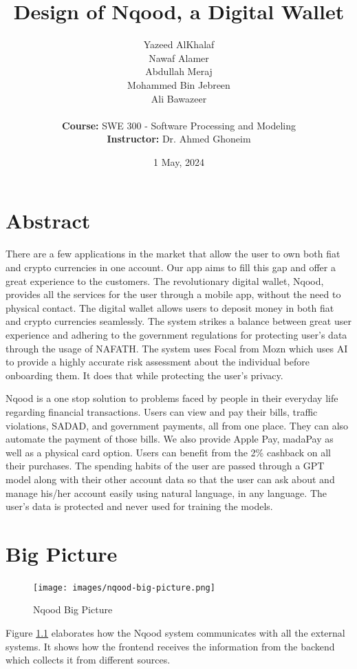 \documentclass[a4paper]{report}
\title{Design of Nqood, a Digital Wallet}
\author{
    Yazeed AlKhalaf \\
    Nawaf Alamer  \\
    Abdullah Meraj \\
    Mohammed Bin Jebreen \\
    Ali Bawazeer \\
    \\
    \textbf{Course:} SWE 300 - Software Processing and Modeling \\
    \textbf{Instructor:} Dr. Ahmed Ghoneim
}
\date{1 May, 2024}
\begin{document}
\maketitle

\newpage

\tableofcontents

\chapter*{Abstract}

There are a few applications in the market that allow the user to own both fiat and crypto currencies in one account. Our app aims to fill this gap and offer a great experience to the customers. The revolutionary digital wallet, Nqood, provides all the services for the user through a mobile app, without the need to physical contact. The digital wallet allows users to deposit money in both fiat and crypto currencies seamlessly. The system strikes a balance between great user experience and adhering to the government regulations for protecting user’s data through the usage of NAFATH. The system uses Focal from Mozn which uses AI to provide a highly accurate risk assessment about the individual before onboarding them. It does that while protecting the user’s privacy.

Nqood is a one stop solution to problems faced by people in their everyday life regarding financial transactions. Users can view and pay their bills, traffic violations, SADAD, and government payments, all from one place. They can also automate the payment of those bills. We also provide Apple Pay, madaPay as well as a physical card option. Users can benefit from the 2\% cashback on all their purchases. The spending habits of the user are passed through a GPT model along with their other account data so that the user can ask about and manage his/her account easily using natural language, in any language. The user’s data is protected and never used for training the models.

\chapter{Big Picture}

\begin{figure}[h!]
    \centering
    \texttt{[image: images/nqood-big-picture.png]}
    \caption{Nqood Big Picture}
    \label{fig:big-picture}
\end{figure}

Figure \ref{fig:big-picture} elaborates how the Nqood system communicates with all the external systems. It shows how the frontend receives the information from the backend which collects it from different sources.
\end{document}
